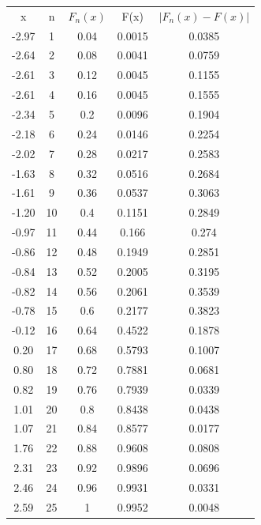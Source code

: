 \documentclass{article}
\begin{document}
\begin{center}
    \begin{tabular}{c c c c c}
        x     & n  & $F_n(x)$ & F(x)   & $|F_n(x)-F(x)|$ \\
        -2.97 & 1  & 0.04     & 0.0015 & 0.0385          \\
        -2.64 & 2  & 0.08     & 0.0041 & 0.0759          \\
        -2.61 & 3  & 0.12     & 0.0045 & 0.1155          \\
        -2.61 & 4  & 0.16     & 0.0045 & 0.1555          \\
        -2.34 & 5  & 0.2      & 0.0096 & 0.1904          \\
        -2.18 & 6  & 0.24     & 0.0146 & 0.2254          \\
        -2.02 & 7  & 0.28     & 0.0217 & 0.2583          \\
        -1.63 & 8  & 0.32     & 0.0516 & 0.2684          \\
        -1.61 & 9  & 0.36     & 0.0537 & 0.3063          \\
        -1.20 & 10 & 0.4      & 0.1151 & 0.2849          \\
        -0.97 & 11 & 0.44     & 0.166  & 0.274           \\
        -0.86 & 12 & 0.48     & 0.1949 & 0.2851          \\
        -0.84 & 13 & 0.52     & 0.2005 & 0.3195          \\
        -0.82 & 14 & 0.56     & 0.2061 & 0.3539          \\
        -0.78 & 15 & 0.6      & 0.2177 & 0.3823          \\
        -0.12 & 16 & 0.64     & 0.4522 & 0.1878          \\
        0.20  & 17 & 0.68     & 0.5793 & 0.1007          \\
        0.80  & 18 & 0.72     & 0.7881 & 0.0681          \\
        0.82  & 19 & 0.76     & 0.7939 & 0.0339          \\
        1.01  & 20 & 0.8      & 0.8438 & 0.0438          \\
        1.07  & 21 & 0.84     & 0.8577 & 0.0177          \\
        1.76  & 22 & 0.88     & 0.9608 & 0.0808          \\
        2.31  & 23 & 0.92     & 0.9896 & 0.0696          \\
        2.46  & 24 & 0.96     & 0.9931 & 0.0331          \\
        2.59  & 25 & 1        & 0.9952 & 0.0048          \\
    \end{tabular}
\end{center}
\end{document}
